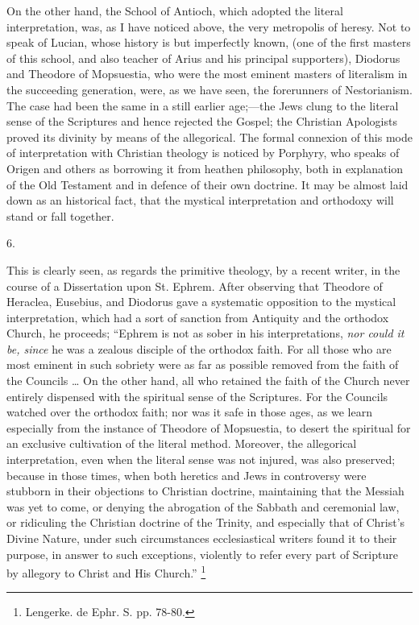 On the other hand, the School of Antioch, which adopted the literal
interpretation, was, as I have noticed above, the very metropolis of
heresy. Not to speak of Lucian, whose history is but imperfectly
known, (one of the first masters of this school, and also teacher of
Arius and his principal supporters), Diodorus and Theodore of
Mopsuestia, who were the most eminent masters of literalism in the
succeeding generation, were, as we have seen, the forerunners of
Nestorianism. The case had been the same in a still earlier age;—the
Jews clung to the literal sense of the Scriptures and hence rejected
the Gospel; the Christian Apologists proved its divinity by means of
the allegorical. The formal connexion of this mode of interpretation
with Christian theology is noticed by Porphyry, who speaks of Origen
and others as borrowing it from heathen philosophy, both in
explanation of the Old Testament and in defence of their own doctrine.
It may be almost laid down as an historical fact, that the mystical
interpretation and orthodoxy will stand or fall together.

6.

This is clearly seen, as regards the primitive theology, by a
recent writer, in the course of a Dissertation upon St. Ephrem. After
observing that Theodore of Heraclea, Eusebius, and Diodorus gave a
systematic opposition to the mystical interpretation, which had a sort
of sanction from Antiquity and the orthodox Church, he proceeds;
``Ephrem is not as sober in his interpretations, \emph{nor could it
be, since} he was a zealous disciple of the orthodox faith. For all
those who are most eminent in such sobriety were as far as possible
removed from the faith of the Councils … On the other hand, all who
retained the faith of the Church never entirely dispensed with the
spiritual sense of the Scriptures. For the Councils watched over the
orthodox faith; nor was it safe in those ages, as we learn especially
from the instance of Theodore of Mopsuestia, to desert the spiritual
for an exclusive cultivation of the literal method. Moreover, the
allegorical interpretation, even when the literal sense was not
injured, was also preserved; because in those times, when both
heretics and Jews in controversy were stubborn in their objections to
Christian doctrine, maintaining that the Messiah was yet to come, or
denying the abrogation of the Sabbath and ceremonial law, or
ridiculing the Christian doctrine of the Trinity, and especially that
of Christ's Divine Nature, under such circumstances ecclesiastical
writers found it to their purpose, in answer to such exceptions,
violently to refer every part of Scripture by allegory to Christ and
His Church.'' \footnote{Lengerke. de Ephr. S. pp. 78-80.}

